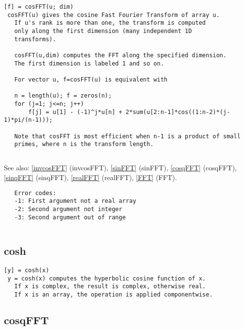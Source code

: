 \documentclass[a4paper]{article}
\begin{document}
\begin{tscreen}
\begin{verbatim}
[f] = cosFFT(u; dim)
 cosFFT(u) gives the cosine Fast Fourier Transform of array u.
   If u's rank is more than one, the transform is computed
   only along the first dimension (many independent 1D
   transforms).

   cosFFT(u,dim) computes the FFT along the specified dimension.
   The first dimension is labeled 1 and so on.

   For vector u, f=cosFFT(u) is equivalent with

   n = length(u); f = zeros(n);
   for (j=1; j<=n; j++)
       f[j] = u[1] - (-1)^j*u[n] + 2*sum(u[2:n-1]*cos((1:n-2)*(j-1)*pi/(n-1)));

   Note that cosFFT is most efficient when n-1 is a product of small
   primes, where n is the transform length.
           
\end{verbatim}

See also: \ref{invcosFFT} {(invcosFFT)}, \ref{sinFFT} {(sinFFT)}, \ref{cosqFFT} {(cosqFFT)}, \ref{sinqFFT} {(sinqFFT)}, \ref{realFFT} {(realFFT)}, \ref{FFT} {(FFT)}.
\begin{verbatim}
   Error codes:
   -1: First argument not a real array
   -2: Second argument not integer
   -3: Second argument out of range
   
\end{verbatim}
\end{tscreen}





\subsection{cosh\label{cosh}}

\begin{tscreen}
\begin{verbatim}
[y] = cosh(x)
 y = cosh(x) computes the hyperbolic cosine function of x.
   If x is complex, the result is complex, otherwise real.
   If x is an array, the operation is applied componentwise.
\end{verbatim}
\end{tscreen}





\subsection{cosqFFT\label{cosqFFT}}
\end{document}
